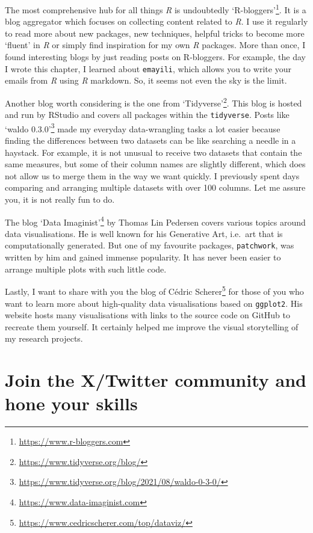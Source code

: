 \documentclass[
  letterpaper,
]{krantz}
\renewcommand{\href}[2]{#2\footnote{\url{#1}}}
\begin{document}
The most comprehensive hub for all things \emph{R} is undoubtedly
\href{https://www.r-bloggers.com}{`R-bloggers'}. It is a blog aggregator
which focuses on collecting content related to \emph{R}. I use it
regularly to read more about new packages, new techniques, helpful
tricks to become more `fluent' in \emph{R} or simply find inspiration
for my own \emph{R} packages. More than once, I found interesting blogs
by just reading posts on R-bloggers. For example, the day I wrote this
chapter, I learned about \texttt{emayili}, which allows you to write
your emails from \emph{R} using \emph{R} markdown. So, it seems not even
the sky is the limit.

Another blog worth considering is the one from
\href{https://www.tidyverse.org/blog/}{`Tidyverse'}. This blog is hosted
and run by RStudio and covers all packages within the
\texttt{tidyverse}. Posts like
\href{https://www.tidyverse.org/blog/2021/08/waldo-0-3-0/}{`waldo
0.3.0'} made my everyday data-wrangling tasks a lot easier because
finding the differences between two datasets can be like searching a
needle in a haystack. For example, it is not unusual to receive two
datasets that contain the same measures, but some of their column names
are slightly different, which does not allow us to merge them in the way
we want quickly. I previously spent days comparing and arranging
multiple datasets with over 100 columns. Let me assure you, it is not
really fun to do.

The blog \href{https://www.data-imaginist.com}{`Data Imaginist'} by
Thomas Lin Pedersen covers various topics around data visualisations. He
is well known for his Generative Art, i.e.~art that is computationally
generated. But one of my favourite packages, \texttt{patchwork}, was
written by him and gained immense popularity. It has never been easier
to arrange multiple plots with such little code.

Lastly, I want to share with you the
\href{https://www.cedricscherer.com/top/dataviz/}{blog of Cédric
Scherer} for those of you who want to learn more about high-quality data
visualisations based on \texttt{ggplot2}. His website hosts many
visualisations with links to the source code on GitHub to recreate them
yourself. It certainly helped me improve the visual storytelling of my
research projects.

\section{Join the X/Twitter community and hone your
skills}\label{sec-next-steps-twitter}
\end{document}
